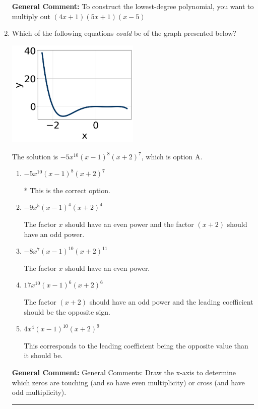 \documentclass{extbook}[14pt]
\newcommand{\litem}[1]{\item #1

\rule{\textwidth}{0.4pt}}
\begin{document}
\begin{enumerate}
{\textbf{General Comment:} To construct the lowest-degree polynomial, you want to multiply out $(4x + 1)(5x + 1)(x -5)$
}
\litem{
Which of the following equations \textit{could} be of the graph presented below?

\begin{center}
    \includegraphics[width=0.5\textwidth]{../Figures/polyGraphToFunctionA.png}
\end{center}



The solution is \( -5x^{10} (x - 1)^{8} (x + 2)^{7} \), which is option A.\begin{enumerate}[label=\Alph*.]
\item \( -5x^{10} (x - 1)^{8} (x + 2)^{7} \)

* This is the correct option.
\item \( -9x^{5} (x - 1)^{4} (x + 2)^{4} \)

The factor $x$ should have an even power and the factor $(x + 2)$ should have an odd power.
\item \( -8x^{7} (x - 1)^{10} (x + 2)^{11} \)

The factor $x$ should have an even power.
\item \( 17x^{10} (x - 1)^{6} (x + 2)^{6} \)

The factor $(x + 2)$ should have an odd power and the leading coefficient should be the opposite sign.
\item \( 4x^{4} (x - 1)^{10} (x + 2)^{9} \)

This corresponds to the leading coefficient being the opposite value than it should be.
\end{enumerate}

\textbf{General Comment:} General Comments: Draw the x-axis to determine which zeros are touching (and so have even multiplicity) or cross (and have odd multiplicity).
}
\end{enumerate}
\end{document}
